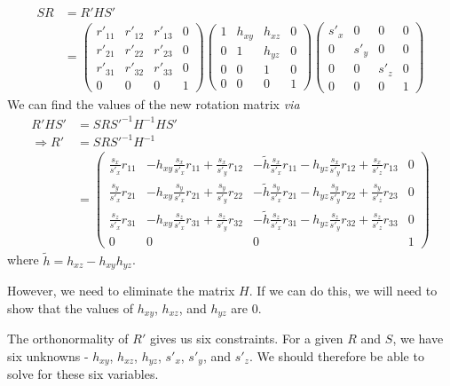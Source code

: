 \documentclass{article}
\begin{document}
\begin{align}
S R &= R' H S'\\
&= \begin{pmatrix}
r'_{11} & r'_{12} & r'_{13} & 0\\
r'_{21} & r'_{22} & r'_{23} & 0\\
r'_{31} & r'_{32} & r'_{33} & 0\\
0 & 0 & 0 & 1
\end{pmatrix}
\begin{pmatrix}
1 & h_{xy} & h_{xz} & 0\\
0 &      1 & h_{yz} & 0\\
0 &      0 &      1 & 0\\
0 &      0 &      0 & 1
\end{pmatrix}
\begin{pmatrix}
s'_x & 0 & 0 & 0\\
0 & s'_y & 0 & 0\\
0 & 0 & s'_z & 0\\
0 & 0 & 0 & 1
\end{pmatrix}
\end{align}
We can find the values of the new rotation matrix \textit{via}
\begin{align}
R'HS' &= SRS'^{-1} H^{-1} H S'\\
\Rightarrow R' &= S R S'^{-1} H^{-1}\\
&= \begin{pmatrix}
\frac{s_x}{s'_x} r_{11} & - h_{xy} \frac{s_x}{s'_x} r_{11} + \frac{s_x}{s'_y} r_{12} & - \widetilde{h} \frac{s_x}{s'_x} r_{11} - h_{yz} \frac{s_x}{s'_y} r_{12} + \frac{s_x}{s'_z} r_{13} & 0\\
\frac{s_y}{s'_x} r_{21} & -h_{xy} \frac{s_y}{s'_x} r_{21} + \frac{s_y}{s'_y} r_{22} &  - \widetilde{h} \frac{s_y}{s'_x} r_{21} - h_{yz} \frac{s_y}{s'_y} r_{22} + \frac{s_y}{s'_z} r_{23} & 0\\
\frac{s_z}{s'_x} r_{31} & -h_{xy} \frac{s_z}{s'_x} r_{31} + \frac{s_z}{s'_y} r_{32} &  - \widetilde{h} \frac{s_z}{s'_x} r_{31} - h_{yz} \frac{s_z}{s'_y} r_{32}  + \frac{s_z}{s'_z} r_{33} & 0\\
0 & 0 & 0 & 1
\end{pmatrix}
\end{align}
where $\widetilde{h} = h_{xz} - h_{xy}h_{yz}$.

However, we need to eliminate the matrix $H$. If we can do this, we will need to show that the values of $h_{xy}$, $h_{xz}$, and $h_{yz}$ are 0.

The orthonormality of $R'$ gives us six constraints. For a given $R$ and $S$, we have six unknowns - $h_{xy}$, $h_{xz}$, $h_{yz}$, $s'_x$, $s'_y$, and $s'_z$. We should therefore be able to solve for these six variables.
\end{document}
